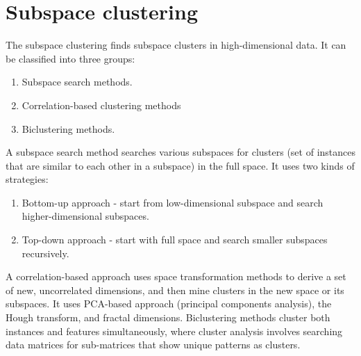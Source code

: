 \section{Subspace clustering}
The subspace clustering finds subspace clusters in high-dimensional data. It can be classified into three groups:
\begin{enumerate}
    \item Subspace search methods.
    \item Correlation-based clustering methods
    \item Biclustering methods.
\end{enumerate}
A subspace search method searches various subspaces for clusters (set of instances that are similar to each other in a subspace) in the full space. It uses two kinds of strategies: 
\begin{enumerate}
    \item Bottom-up approach - start from low-dimensional subspace and search higher-dimensional subspaces.
    \item Top-down approach - start with full space and search smaller subspaces recursively.
\end{enumerate}
A correlation-based approach uses space transformation methods to derive a set of new, uncorrelated dimensions, and then mine clusters in the new space or its subspaces. It uses PCA-based approach (principal components analysis), the Hough transform, and fractal dimensions. Biclustering methods cluster both instances and features simultaneously, where cluster analysis involves searching data matrices for sub-matrices that show unique patterns as clusters.
